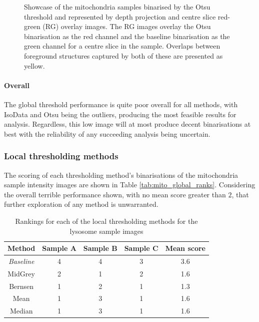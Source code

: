 \begin{figure}
	\caption[Showcase of the mitochondria samples binarised by the Otsu threshold and represented by depth projection and red-green overlay images.]{Showcase of the mitochondria samples binarised by the Otsu threshold and represented by depth projection and centre slice red-green (RG) overlay images. The RG images overlay the Otsu binarisation as the red channel and the baseline binarisation as the green channel for a centre slice in the sample. Overlaps between foreground structures captured by both of these are presented as yellow.}
	\label{fig:mito_Otsu}
\end{figure}

\paragraph{Overall}
The global threshold performance is quite poor overall for all methods, with IsoData and Otsu being the outliers, producing the most feasible results for analysis. Regardless, this low image will at most produce decent binarisations at best with the reliability of any succeeding analysis being uncertain.

\subsubsection{Local thresholding methods}
The scoring of each thresholding method's binarisations of the mitochondria sample intensity images are shown in Table \ref{tab:mito_global_ranks}. Considering the overall terrible performance shown, with no mean score greater than $2$, that further exploration of any method is unwarranted.
\begin{table}[hb!]
	\centering
	\begin{tabular}{|c|c|c|c|c|}
		\hline
		\textbf{Method} & \textbf{Sample A} & \textbf{Sample B} & \textbf{Sample C} & \textbf{Mean score} \\
		\hline
		\textit{Baseline} & 4 & 4 & 3 & 3.6\\
		\hline
		MidGrey & 2 & 1 & 2 & 1.6 \\
		\hline
		Bernsen & 1 & 2 & 1 & 1.3 \\
		\hline
		Mean & 1 & 3 & 1 & 1.6 \\
		\hline
		Median & 1 & 3 & 1 & 1.6 \\
		\hline
	\end{tabular}
	\caption{Rankings for each of the local thresholding methods for the lysosome sample images}
	\label{tab:mito_local_ranks}
\end{table}

